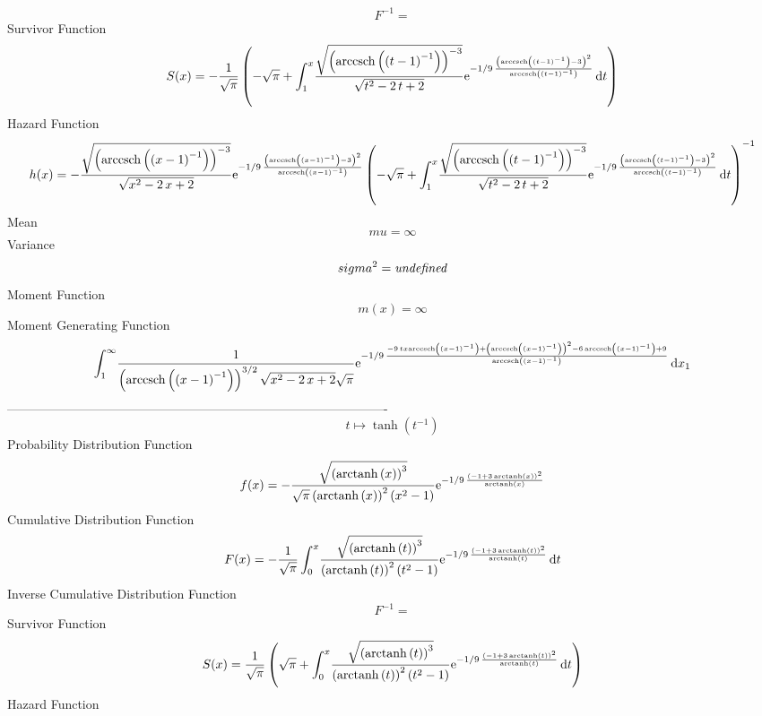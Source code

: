 \documentclass[12pt]{article}
\begin{document}
  $$F^{-1} = $$Survivor Function 
 $$ S(x)=-{\frac {1}{\sqrt {\pi}} \left( -\sqrt {\pi}+\int_{1}^{x}\!{\frac {
\sqrt { \left( {\rm arccsch} \left( \left( t-1 \right) ^{-1}\right)
 \right) ^{-3}}}{\sqrt {{t}^{2}-2\,t+2}}{{\rm e}^{-1/9\,{\frac {
 \left( {\rm arccsch} \left( \left( t-1 \right) ^{-1}\right)-3
 \right) ^{2}}{{\rm arccsch} \left( \left( t-1 \right) ^{-1}\right)}}}
}}\,{\rm d}t \right) }
$$ Hazard Function 
 $$ h(x)=-{\frac {\sqrt { \left( {\rm arccsch} \left( \left( x-1 \right) ^{-1}
\right) \right) ^{-3}}}{\sqrt {{x}^{2}-2\,x+2}}{{\rm e}^{-1/9\,{\frac 
{ \left( {\rm arccsch} \left( \left( x-1 \right) ^{-1}\right)-3
 \right) ^{2}}{{\rm arccsch} \left( \left( x-1 \right) ^{-1}\right)}}}
} \left( -\sqrt {\pi}+\int_{1}^{x}\!{\frac {\sqrt { \left( 
{\rm arccsch} \left( \left( t-1 \right) ^{-1}\right) \right) ^{-3}}}{
\sqrt {{t}^{2}-2\,t+2}}{{\rm e}^{-1/9\,{\frac { \left( {\rm arccsch} 
\left( \left( t-1 \right) ^{-1}\right)-3 \right) ^{2}}{{\rm arccsch} 
\left( \left( t-1 \right) ^{-1}\right)}}}}}\,{\rm d}t \right) ^{-1}}
$$Mean 
 $$ mu=\infty 
$$ Variance 
 $$ sigma^2 = {\it undefined}
$$Moment Function 
 $$ m(x) = \infty 
$$ Moment Generating Function 
 $$\int_{1}^{\infty }\!{\frac {1}{ \left( {\rm arccsch} \left( \left( x-1
 \right) ^{-1}\right) \right) ^{3/2}\sqrt {{x}^{2}-2\,x+2}\sqrt {\pi}}
{{\rm e}^{-1/9\,{\frac {-9\,tx{\rm arccsch} \left( \left( x-1 \right) 
^{-1}\right)+ \left( {\rm arccsch} \left( \left( x-1 \right) ^{-1}
\right) \right) ^{2}-6\,{\rm arccsch} \left( \left( x-1 \right) ^{-1}
\right)+9}{{\rm arccsch} \left( \left( x-1 \right) ^{-1}\right)}}}}}
\,{\rm d}x_{{1}}
$$-------------------------------------------------------------------------------------------  \\$$t\mapsto \tanh \left( {t}^{-1} \right) 
$$Probability Distribution Function 
$$  f(x)=-{\frac {\sqrt { \left( {\rm arctanh} \left(x\right) \right) ^{3}}}{
\sqrt {\pi} \left( {\rm arctanh} \left(x\right) \right) ^{2} \left( {x
}^{2}-1 \right) }{{\rm e}^{-1/9\,{\frac { \left( -1+3\,{\rm arctanh} 
\left(x\right) \right) ^{2}}{{\rm arctanh} \left(x\right)}}}}}
$$Cumulative Distribution Function  
 $$F(x)=-{\frac {1}{\sqrt {\pi}}\int_{0}^{x}\!{\frac {\sqrt { \left( 
{\rm arctanh} \left(t\right) \right) ^{3}}}{ \left( {\rm arctanh} 
\left(t\right) \right) ^{2} \left( {t}^{2}-1 \right) }{{\rm e}^{-1/9\,
{\frac { \left( -1+3\,{\rm arctanh} \left(t\right) \right) ^{2}}{
{\rm arctanh} \left(t\right)}}}}}\,{\rm d}t}
$$ Inverse Cumulative Distribution Function 
  $$F^{-1} = $$Survivor Function 
 $$ S(x)={\frac {1}{\sqrt {\pi}} \left( \sqrt {\pi}+\int_{0}^{x}\!{\frac {
\sqrt { \left( {\rm arctanh} \left(t\right) \right) ^{3}}}{ \left( 
{\rm arctanh} \left(t\right) \right) ^{2} \left( {t}^{2}-1 \right) }{
{\rm e}^{-1/9\,{\frac { \left( -1+3\,{\rm arctanh} \left(t\right)
 \right) ^{2}}{{\rm arctanh} \left(t\right)}}}}}\,{\rm d}t \right) }
$$ Hazard Function 
\end{document}
